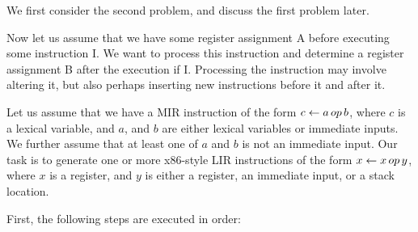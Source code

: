 We first consider the second problem, and discuss the first problem later.

Now let us assume that we have some register assignment A before
executing some instruction I.  We want to process this instruction and
determine a register assignment B after the execution if I.
Processing the instruction may involve altering it, but also perhaps
inserting new instructions before it and after it.

Let us assume that we have a MIR instruction of the form $c \leftarrow
a\thinspace op\thinspace b$, where $c$ is a lexical variable, and $a$,
and $b$ are either lexical variables or immediate inputs.  We further
assume that at least one of $a$ and $b$ is not an immediate input.
Our task is to generate one or more x86-style LIR instructions of the
form $x \leftarrow x\thinspace op\thinspace y$, where $x$ is a
register, and $y$ is either a register, an immediate input, or a stack
location.



First, the following steps are executed in order:

